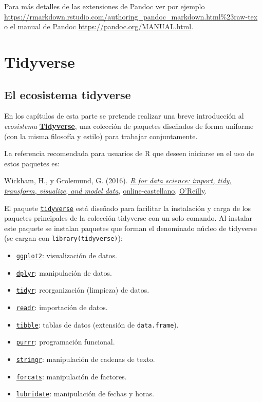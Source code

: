 \documentclass[
]{book}
\providecommand{\tightlist}{%
  \setlength{\itemsep}{0pt}\setlength{\parskip}{0pt}}
\theoremstyle{break}
\theoremstyle{nonumberplain}
\begin{document}
Para más detalles de las extensiones de Pandoc ver por ejemplo
\url{https://rmarkdown.rstudio.com/authoring_pandoc_markdown.html\%23raw-tex}
o el manual de Pandoc \url{https://pandoc.org/MANUAL.html}.

\hypertarget{part-tidyverse}{%
\part{Tidyverse}\label{part-tidyverse}}

\hypertarget{tidyverse}{%
\chapter{El ecosistema tidyverse}\label{tidyverse}}

En los capítulos de esta parte se pretende realizar una breve introducción al \emph{ecosistema} \href{https://dplyr.tidyverse.org}{\textbf{Tidyverse}}, una colección de paquetes diseñados de forma uniforme (con la misma filosofía y estilo) para trabajar conjuntamente.

La referencia recomendada para usuarios de R que deseen iniciarse en el uso de estos paquetes es:

Wickham, H., y Grolemund, G. (2016). \emph{\href{http://r4ds.had.co.nz}{R for data science: import, tidy, transform, visualize, and model data}}, \href{https://es.r4ds.hadley.nz}{online-castellano}, \href{http://shop.oreilly.com/product/0636920034407.do}{O'Reilly}.

El paquete \href{https://tidyverse.tidyverse.org}{\texttt{tidyverse}} está diseñado para facilitar la instalación y carga de los paquetes principales de la colección tidyverse con un solo comando.
Al instalar este paquete se instalan paquetes que forman el denominado núcleo de tidyverse (se cargan con \texttt{library(tidyverse)}):

\begin{itemize}
\tightlist
\item
  \href{https://ggplot2.tidyverse.org}{\texttt{ggplot2}}: visualización de datos.
\item
  \href{https://dplyr.tidyverse.org}{\texttt{dplyr}}: manipulación de datos.
\item
  \href{https://tidyr.tidyverse.org}{\texttt{tidyr}}: reorganización (limpieza) de datos.
\item
  \href{https://readr.tidyverse.org}{\texttt{readr}}: importación de datos.
\item
  \href{https://tibble.tidyverse.org}{\texttt{tibble}}: tablas de datos (extensión de \texttt{data.frame}).
\item
  \href{https://purrr.tidyverse.org}{\texttt{purrr}}: programación funcional.
\item
  \href{https://github.com/tidyverse/stringr}{\texttt{stringr}}: manipulación de cadenas de texto.
\item
  \href{https://github.com/tidyverse/forcats}{\texttt{forcats}}: manipulación de factores.
\item
  \href{https://github.com/tidyverse/lubridate}{\texttt{lubridate}}: manipulación de fechas y horas.
\end{itemize}
\end{document}
